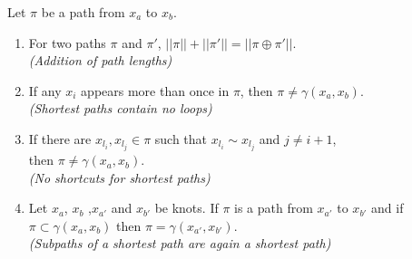 \clearpage
\begin{lemma}{}{}
	Let $\pi$ be a path from $x_a$ to $x_b$.
	\begin{enumerate}
	\item For two paths $\pi$ and $\pi'$, $||\pi||+||\pi'|| = ||\pi\oplus \pi'||$. \\
	\textit{(Addition of path lengths)}
	\item If any $x_i$ appears more than once in $\pi$, then 
	$ \pi \neq \gamma(x_a,x_b)$. \\
	\textit{(Shortest paths contain no loops)}
	\item If there are $x_{l_i}, x_{l_j} \in \pi$ such that $x_{l_i}\sim x_{l_j}$ and 
	$j\neq i+1$,\\ then $\pi\neq \gamma(x_a,x_b)$.\\
	\textit{(No shortcuts for shortest paths)}
	\item Let $x_a$, $x_b$ ,$x_{a'}$ and $x_{b'}$ be knots. If $\pi$ is a path from 
	$x_{a'}$ to $x_{b'}$ and if $\pi\subset \gamma(x_a,x_b)$ then $\pi = \gamma(x_{a'},
	x_{b'} )$.\\
	\textit{(Subpaths of a shortest path are again a shortest path)}
	\end{enumerate}
\end{lemma}
